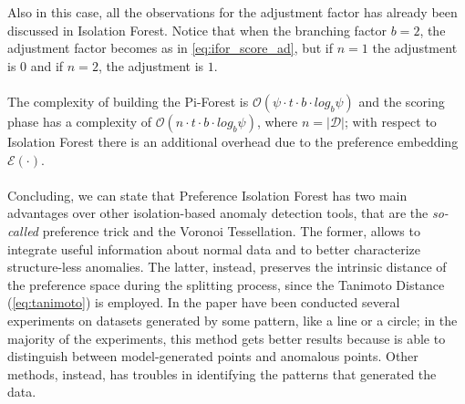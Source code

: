 Also in this case, all the observations for the adjustment factor has already been discussed in Isolation Forest. Notice that when the branching factor $b = 2$, the adjustment factor becomes as in \ref{eq:ifor_score_ad}, but if $n = 1$ the adjustment is $0$ and if $n = 2$, the adjustment is $1$.

\paragraph{}
The complexity of building the Pi-Forest is $\mathcal{O}(\psi \cdot t \cdot b \cdot log_b \psi)$ and the scoring phase has a complexity of $\mathcal{O}(n \cdot t \cdot b \cdot log_b \psi)$, where $n = |\mathcal{D}|$; with respect to Isolation Forest there is an additional overhead due to the preference embedding $\mathcal{E}(\cdot)$.

\paragraph{}
Concluding, we can state that Preference Isolation Forest has two main advantages over other isolation-based anomaly detection tools, that are the \textit{so-called} preference trick and the Voronoi Tessellation. The former, allows to integrate useful information about normal data and to better characterize structure-less anomalies. The latter, instead, preserves the intrinsic distance of the preference space during the splitting process, since the Tanimoto Distance (\ref{eq:tanimoto}) is employed. \newline
In the paper have been conducted several experiments on datasets generated by some pattern, like a line or a circle; in the majority of the experiments, this method gets better results because is able to distinguish between model-generated points and anomalous points. Other methods, instead, has troubles in identifying the patterns that generated the data.